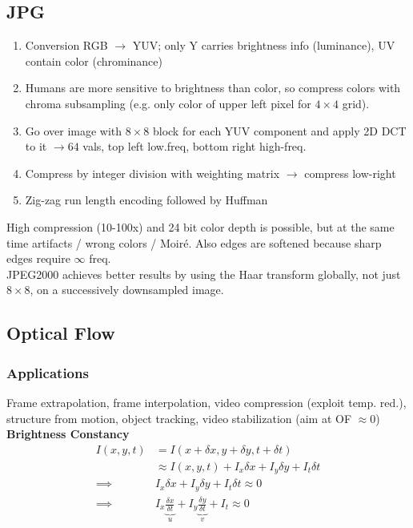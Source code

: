 \documentclass[a4paper,10pt]{article}
\begin{document}
\subsection{JPG}
\begin{enumerate}
    \item Conversion RGB \( \to \) YUV; only Y carries brightness info (luminance), UV contain color (chrominance)
    \item Humans are more sensitive to brightness than color, so compress colors with chroma subsampling (e.g. only color of upper left pixel for \( 4\times 4\) grid).
    \item Go over image with \( 8 \times 8 \) block for each YUV component and apply 2D DCT to it \( \rightarrow 64 \) vals, top left low.freq, bottom right high-freq.
    \item Compress by integer division with weighting matrix \( \rightarrow \) compress low-right
    \item Zig-zag run length encoding followed by Huffman
\end{enumerate}
High compression (10-100x) and 24 bit color depth is possible, but at the same time artifacts / wrong colors / Moiré. Also edges are softened because sharp edges require \( \infty \) freq.\\
JPEG2000 achieves better results by using the Haar transform globally, not just \( 8 \times 8 \), on a successively downsampled image.

\subsection{Optical Flow}
\subsubsection{Applications} Frame extrapolation, frame interpolation, video compression (exploit temp. red.), structure from motion, object tracking, video stabilization (aim at OF \( \approx 0 \))
\textbf{Brightness Constancy}
\begin{align*}
    I(x,y,t) &= I(x+ \delta x, y + \delta y, t + \delta t) \\
	     &\approx I(x,y,t) + I_x \delta x + I_y \delta y + I_t \delta t \tag{Taylor approx., good if small motion}\\
    \implies &I_x \delta x + I_y \delta y + I_t \delta t \approx 0 \\
    \implies &I_x \underbrace{\frac{\delta x}{\delta t}}_u + I_y \underbrace{\frac{\delta y}{\delta t}}_v + I_t \approx 0
\end{align*}
\end{document}
